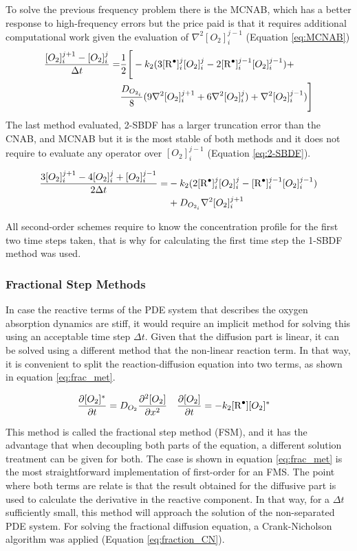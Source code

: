 \begin{refsection}
To solve the previous frequency problem there is the MCNAB, which has a better response to high-frequency errors but the price paid is that it requires additional computational work given the evaluation of $\nabla^2[O_2]_i^{j-1}$ \cite{ascher1995implicit} (Equation \ref{eq:MCNAB})
\begin{align}
  \frac{[O_2]^{j+1}_i-[O_2]^j_i}{\Delta t}=& \frac{1}{2}\Biggr[-k_2(3[\ce{R^.}]_i^{j}[O_2]_i^{j}-2[\ce{R^.}]_i^{j-1}[O_2]_i^{j-1})+\nonumber\\
  &\frac{D_{O_{2_i}}}{8}(9\nabla^2[O_2]_i^{j+1}+6\nabla^2[O_2]_i^{j})+\nabla^2[O_2]_i^{j-1})\Biggr]  
  \label{eq:MCNAB}
\end{align}
The last method evaluated, 2-SBDF has a larger truncation error than the CNAB, and MCNAB but it is the most stable of both methods and it does not require to evaluate any operator over $[O_2]_i^{j-1}$ (Equation \ref{eq:2-SBDF}).

\begin{align}
    \frac{3[O_2]^{j+1}_i-4[O_2]^j_i+[O_2]^{j-1}_i}{2\Delta t}=&-k_2(2[\ce{R^.}]_i^{j}[O_2]_i^{j}-[\ce{R^.}]_i^{j-1}[O_2]_i^{j-1})\nonumber\\
    &+D_{O_{2_i}}\nabla^2[O_2]_i^{j+1} 
    \label{eq:2-SBDF}
\end{align}

All second-order schemes require to know the concentration profile for the first two time steps taken, that is why for calculating the first time step the 1-SBDF method was used. 

\subsubsection{Fractional Step Methods}
In case the reactive terms of the PDE system that describes the oxygen absorption dynamics are stiff, it would require an implicit method for solving this using an acceptable time step $\Delta t$. Given that the diffusion part is linear, it can be solved using a different method that the non-linear reaction term. In that way, it is convenient to split the reaction-diffusion equation into two terms, as shown in equation \ref{eq:frac_met}.

\begin{align}
        \frac{\partial [O_2]^*}{\partial t}&=D_{O_2}\frac{\partial^2[O_2]}{\partial x^2}&
        \frac{\partial [O_2]}{\partial t} &=-k_2[\ce{R^.}][O_2]^*
    \label{eq:frac_met}
\end{align}

This method is called the fractional step method (FSM), and it has the advantage that when decoupling both parts of the equation, a different solution treatment can be given for both. The case is shown in equation  \ref{eq:frac_met} is the most straightforward implementation of first-order for an FMS. The point where both terms are relate is that the result obtained for the diffusive part is used to calculate the derivative in the reactive component. In that way, for a $\Delta t$ sufficiently small, this method will approach the solution of the non-separated PDE system. For solving the fractional diffusion equation, a Crank-Nicholson algorithm was applied (Equation \ref{eq:fraction_CN}).


\end{refsection}
